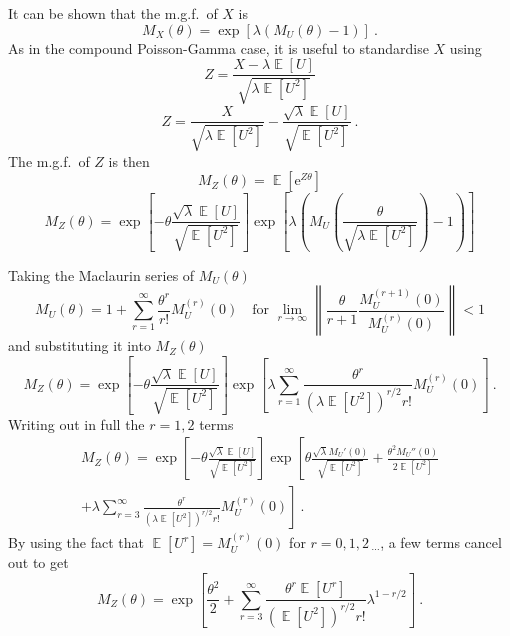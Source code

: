 \documentclass[12pt, a4paper]{memoir}
\DeclareMathOperator{\expectation}{\mathbb{E}}
\newcommand{\euler}{\mathrm{e}}
\newcommand{\dotdotdot}{_{\phantom{.}\cdots}}
\begin{document}
It can be shown that the m.g.f.~of $X$ is
\begin{equation}
	M_X(\theta)=
	\exp\left[
		\lambda(M_U(\theta)-1)
	\right]
	\ .
\end{equation}
As in the compound Poisson-Gamma case, it is useful to standardise $X$ using
\begin{equation*}
	Z = \frac{X-\lambda\expectation[U]}{\sqrt{\lambda\expectation[U^2]}}
\end{equation*}
\begin{equation}
	Z = \frac{X}{\sqrt{\lambda\expectation[U^2]}}
	-\frac{\sqrt{\lambda}\expectation[U]}{\sqrt{\expectation[U^2]}}
	\ .
\end{equation}
The m.g.f.~of $Z$ is then
\begin{equation*}
	M_Z(\theta)=\expectation\left[\euler^{Z\theta}\right]
\end{equation*}
\begin{equation*}
	M_Z(\theta)=
	\exp\left[
	    -\theta\frac{\sqrt{\lambda}\expectation[U]}{\sqrt{\expectation[U^2]}}
	\right]
	\exp\left[
	\lambda
	\left(
		M_U
		\left(
			\frac{\theta}{\sqrt{\lambda\expectation[U^2]}}\right)-1
		\right)
	\right]
\end{equation*}

Taking the Maclaurin series of $M_U(\theta)$
\begin{equation}
	M_U(\theta) = 1 + \sum_{r=1}^\infty\frac{\theta^r}{r!}M_U^{(r)}(0)
	\quad\text{for }\lim_{r\rightarrow\infty}
	\left\|
		\frac{\theta}{r+1}\frac{M_U^{(r+1)}(0)}{M_U^{(r)}(0)}
	\right\|<1
\end{equation}
and substituting it into $M_Z(\theta)$
\begin{equation*}
	M_Z(\theta)=
	\exp\left[
	    -\theta\frac{\sqrt{\lambda}\expectation[U]}{\sqrt{\expectation[U^2]}}
    \right]
	\exp\left[
		\lambda\sum_{r=1}^\infty\frac{\theta^r}{(\lambda\expectation[U^2])^{r/2}r!}M_U^{(r)}(0)
	\right]
	\ .
\end{equation*}
Writing out in full the $r=1,2$ terms
\begin{multline*}
	M_Z(\theta)=\exp\left[
	    -\theta\frac{\sqrt{\lambda}\expectation[U]}{\sqrt{\expectation[U^2]}}
	\right]
	\exp\left[
		\theta\frac{\sqrt{\lambda}M_U'(0)}{\sqrt{\expectation[U^2]}}
		+
		\frac{\theta^2M_U''(0)}{2\expectation[U^2]}
	\right.
	\\+
	\left.
		\lambda\sum_{r=3}^\infty\frac{\theta^r}{(\lambda\expectation[U^2])^{r/2}r!}M_U^{(r)}(0)
	\right]
	\ .
\end{multline*}
By using the fact that $\expectation[U^r]=M_U^{(r)}(0)$ for $r=0,1,2\dotdotdot$, a few terms cancel out to get
\begin{equation}
	M_Z(\theta)=
	\exp\left[
		\frac{\theta^2}{2}
		+
		\sum_{r=3}^\infty\frac{\theta^r \expectation[U^r]}{(\expectation[U^2])^{r/2}r!}\lambda^{1-r/2}
	\right]
	\ .
\end{equation}
\end{document}
